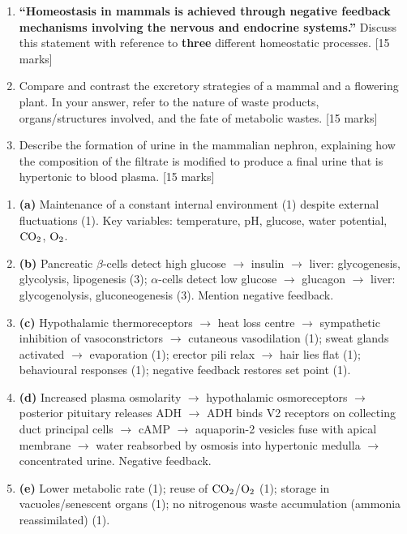 \documentclass[11pt]{article}
\begin{document}
\begin{exercice}
\begin{enumerate}
\item \textbf{``Homeostasis in mammals is achieved through negative feedback mechanisms involving the nervous and endocrine systems.''} Discuss this statement with reference to \textbf{three} different homeostatic processes. [15 marks]
\item Compare and contrast the excretory strategies of a mammal and a flowering plant. In your answer, refer to the nature of waste products, organs/structures involved, and the fate of metabolic wastes. [15 marks]
\item Describe the formation of urine in the mammalian nephron, explaining how the composition of the filtrate is modified to produce a final urine that is hypertonic to blood plasma. [15 marks]
\end{enumerate}
\end{exercice}

\begin{corrige}
\begin{enumerate}
\item \textbf{(a)} Maintenance of a constant internal environment (1) despite external fluctuations (1). Key variables: temperature, pH, glucose, water potential, $\ce{CO2}$, $\ce{O2}$.
\item \textbf{(b)} Pancreatic $\beta$-cells detect high glucose $\to$ insulin $\to$ liver: glycogenesis, glycolysis, lipogenesis (3); $\alpha$-cells detect low glucose $\to$ glucagon $\to$ liver: glycogenolysis, gluconeogenesis (3). Mention negative feedback.
\item \textbf{(c)} Hypothalamic thermoreceptors $\to$ heat loss centre $\to$ sympathetic inhibition of vasoconstrictors $\to$ cutaneous vasodilation (1); sweat glands activated $\to$ evaporation (1); erector pili relax $\to$ hair lies flat (1); behavioural responses (1); negative feedback restores set point (1).
\item \textbf{(d)} Increased plasma osmolarity $\to$ hypothalamic osmoreceptors $\to$ posterior pituitary releases ADH $\to$ ADH binds V2 receptors on collecting duct principal cells $\to$ cAMP $\to$ aquaporin-2 vesicles fuse with apical membrane $\to$ water reabsorbed by osmosis into hypertonic medulla $\to$ concentrated urine. Negative feedback.
\item \textbf{(e)} Lower metabolic rate (1); reuse of $\ce{CO2}$/$\ce{O2}$ (1); storage in vacuoles/senescent organs (1); no nitrogenous waste accumulation (ammonia reassimilated) (1).
\end{enumerate}
\end{corrige}
\end{document}
